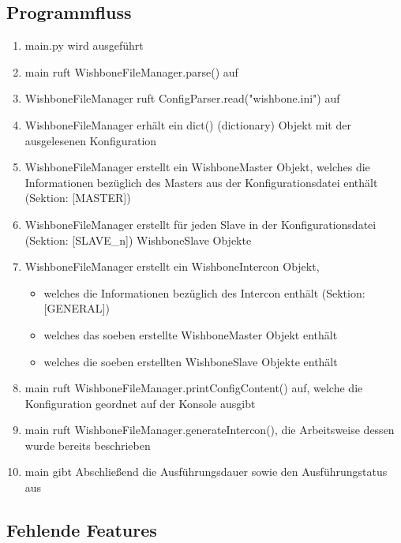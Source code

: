 \documentclass{article}
\begin{document}
\subsection{Programmfluss}
\begin{enumerate}
\item main.py wird ausgeführt
\item main ruft WishboneFileManager.parse() auf
\item WishboneFileManager ruft ConfigParser.read("wishbone.ini") auf
\item WishboneFileManager erhält ein dict() (dictionary) Objekt mit der ausgelesenen Konfiguration
\item WishboneFileManager erstellt ein WishboneMaster Objekt, welches die Informationen bezüglich des Masters aus der Konfigurationsdatei enthält (Sektion: [MASTER])
\item WishboneFileManager erstellt für jeden Slave in der Konfigurationsdatei (Sektion: [SLAVE\_n]) WishboneSlave Objekte
\item WishboneFileManager erstellt ein WishboneIntercon Objekt, 
\begin{itemize}
\item welches die Informationen bezüglich des Intercon enthält (Sektion: [GENERAL])
\item welches das soeben erstellte WishboneMaster Objekt enthält
\item welches die soeben erstellten WishboneSlave Objekte enthält
\end{itemize}
\item main ruft WishboneFileManager.printConfigContent() auf, welche die Konfiguration geordnet auf der Konsole ausgibt
\item main ruft WishboneFileManager.generateIntercon(), die Arbeitsweise dessen wurde bereits beschrieben
\item main gibt Abschließend die Ausführungsdauer sowie den Ausführungstatus aus
\end{enumerate}
\subsection{Fehlende Features}
\end{document}

